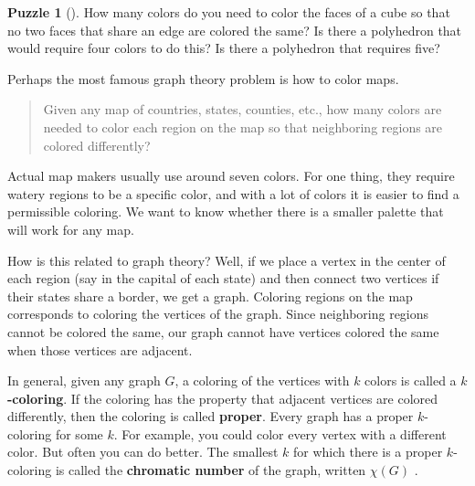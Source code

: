 \documentclass[10pt,]{book}
\newcommand{\terminology}[1]{\textbf{#1}}
\theoremstyle{plain}
\theoremstyle{definition}
\theoremstyle{definition}
\theoremstyle{definition}
\newtheorem{investigation}[project]{Puzzle}
\numberwithin{equation}{chapter}
\begin{document}
\begin{investigation}[]\label{investigation-7}
\hypertarget{p-332}{}%
How many colors do you need to color the faces of a cube so that no two faces that share an edge are colored the same?  Is there a polyhedron that would require four colors to do this?  Is there a polyhedron that requires five?%
\end{investigation}
\hypertarget{p-333}{}%
Perhaps the most famous graph theory problem is how to color maps.%
\begin{quote}\hypertarget{blockquote-2}{}
\hypertarget{p-334}{}%
Given any map of countries, states, counties, etc., how many colors are needed to color each region on the map so that neighboring regions are colored differently?%
\end{quote}
\hypertarget{p-335}{}%
Actual map makers usually use around seven colors. For one thing, they require watery regions to be a specific color, and with a lot of colors it is easier to find a permissible coloring. We want to know whether there is a smaller palette that will work for any map.%
\par
\hypertarget{p-336}{}%
How is this related to graph theory? Well, if we place a vertex in the center of each region (say in the capital of each state) and then connect two vertices if their states share a border, we get a graph. Coloring regions on the map corresponds to coloring the vertices of the graph. Since neighboring regions cannot be colored the same, our graph cannot have vertices colored the same when those vertices are adjacent.%
\par
\hypertarget{p-337}{}%
In general, given any graph \(G\), a coloring of the vertices with \(k\) colors is called a \terminology{\(k\)-coloring}. If the coloring has the property that adjacent vertices are colored differently, then the coloring is called \terminology{proper}. Every graph has a proper \(k\)-coloring for some \(k\). For example, you could color every vertex with a different color. But often you can do better. The smallest \(k\) for which there is a proper \(k\)-coloring is called the \terminology{chromatic number} of the graph, written \(\chi(G)\)\label{notation-6}
.%
\end{document}
